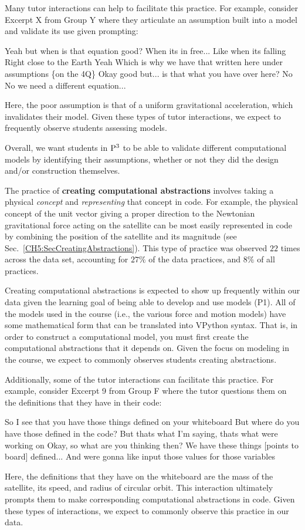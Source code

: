 \documentclass{msuphddissertation}
\begin{document}
\begin{doublespace}
Many tutor interactions can help to facilitate this practice.  For example, consider Excerpt X from Group Y where they articulate an assumption built into a model and validate its use given prompting: \begin{description}
\TA Yeah but when is that equation good?
\SB When its in free...
\SC Like when its falling
\TA Right close to the Earth
\SB Yeah
\SC Which is why we have that written here under assumptions \{on the 4Q\}
\TA Okay good but... is that what you have over here?
\SB No
\SC No we need a different equation...
\end{description}  Here, the poor assumption is that of a uniform gravitational acceleration, which invalidates their model.  Given these types of tutor interactions, we expect to frequently observe students assessing models.

Overall, we want students in ${\rm P}^{3}$ to be able to validate different computational models by identifying their assumptions, whether or not they did the design and/or construction themselves.

The practice of \textbf{creating computational abstractions} involves taking a physical \textit{concept} and \textit{representing} that concept in code.  For example, the physical concept of the unit vector giving a proper direction to the Newtonian gravitational force acting on the satellite can be most easily represented in code by combining the position of the satellite and its magnitude (see Sec.~\ref{CH5:SecCreatingAbstractions}).  This type of practice was observed $22$ times across the data set, accounting for $27\%$ of the data practices, and $8\%$ of all practices.

Creating computational abstractions is expected to show up frequently within our data given the learning goal of being able to develop and use models (P1).  All of the models used in the course (i.e., the various force and motion models) have some mathematical form that can be translated into VPython syntax.  That is, in order to construct a computational model, you must first create the computational abstractions that it depends on.  Given the focus on modeling in the course, we expect to commonly observes students creating abstractions.

Additionally, some of the tutor interactions can facilitate this practice.  For example, consider Excerpt 9 from Group F where the tutor questions them on the definitions that they have in their code: \begin{description}
\TA So I see that you have those things defined on your whiteboard
\TA But where do you have those defined in the code?
\SA But thats what I'm saying, thats what were working on
\TA Okay, so what are you thinking then?
\SA We have these things [points to board] defined...
\SA And were gonna like input those values for those {variables}
\end{description}  Here, the definitions that they have on the whiteboard are the mass of the satellite, its speed, and radius of circular orbit.  This interaction ultimately prompts them to make corresponding computational abstractions in code.  Given these types of interactions, we expect to commonly observe this practice in our data.


\end{doublespace}
\end{document}
